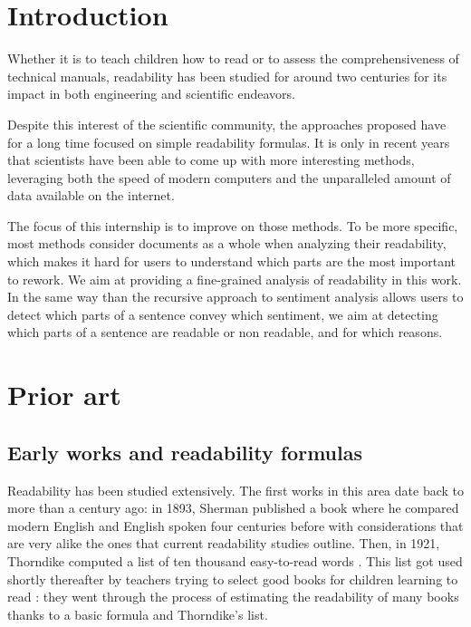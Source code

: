 \documentclass[a4paper, 11pt, onepage]{scrreprt}
\begin{document}
\chapter{Introduction}

Whether it is to teach children how to read or to assess the
comprehensiveness of technical manuals, readability has been studied
for around two centuries for its impact in both engineering and
scientific endeavors.

Despite this interest of the scientific community, the approaches
proposed have for a long time focused on simple readability
formulas. It is only in recent years that scientists have been able to
come up with more interesting methods, leveraging both the speed of
modern computers and the unparalleled amount of data available on the
internet.

The focus of this internship is to improve on those methods. To be
more specific, most methods consider documents as a whole when
analyzing their readability, which makes it hard for users to
understand which parts are the most important to rework. We aim at
providing a fine-grained analysis of readability in this work. In the
same way than the recursive approach to sentiment analysis
\cite{socher2013recursive} allows users to detect which parts of a
sentence convey which sentiment, we aim at detecting which parts of a
sentence are readable or non readable, and for which reasons.

\chapter{Prior art}
\label{sec:sota}

\section{Early works and readability formulas}
\label{sec:early-works-and-formulas}
Readability has been studied extensively. The first works in this area
date back to more than a century ago: in 1893, Sherman published a
book \cite{sherman1893analytics} where he compared modern English and
English spoken four centuries before with considerations that are very
alike the ones that current readability studies outline. Then, in
1921, Thorndike computed a list of ten thousand easy-to-read words
\cite{thorndike1921teacher}. This list got used shortly thereafter by
teachers trying to select good books for children learning to read
\cite{lively1923method}: they went through the process of estimating
the readability of many books thanks to a basic formula and
Thorndike's list.
\end{document}
